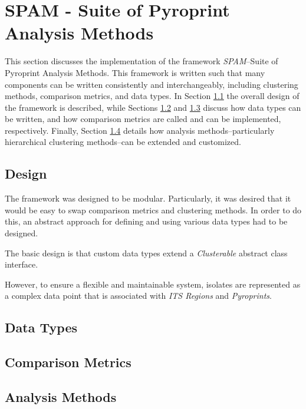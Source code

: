\documentclass[12pt]{ucthesis}
\begin{document}
   \section{SPAM - Suite of Pyroprint Analysis Methods}\label{sec:spam}
      This section discusses the implementation of the framework
      \textit{SPAM}--Suite of Pyroprint Analysis Methods. This framework is
      written such that many components can be written consistently and
      interchangeably, including clustering methods, comparison metrics, and
      data types. In Section \ref{sec:design} the overall design of
      the framework is described, while Sections \ref{sec:data_types} and \ref{sec:metrics}
      discuss how data types can be written, and how comparison metrics are
      called and can be implemented, respectively. Finally, Section
      \ref{sec:analysis} details how analysis methods--particularly
      hierarchical clustering methods--can be extended and customized.

      \subsection{Design}\label{sec:design}
         The framework was designed to be modular. Particularly, it was desired
         that it would be easy to swap comparison metrics and clustering
         methods. In order to do this, an abstract approach for defining and
         using various data types had to be designed.
         
         The basic design is that custom data types extend a
         \textit{Clusterable} abstract class interface.


         However, to ensure a flexible and
         maintainable system, isolates are represented as a complex data point
         that is associated with \textit{ITS Regions} and \textit{Pyroprints}.

      \subsection{Data Types}\label{sec:data_types}

      \subsection{Comparison Metrics}\label{sec:metrics}

      \subsection{Analysis Methods}\label{sec:analysis}
\end{document}
